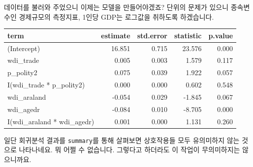 \documentclass[
]{book}
\newenvironment{Shaded}{\begin{snugshade}}{\end{snugshade}}
\newcommand{\DataTypeTok}[1]{\textcolor[rgb]{0.13,0.29,0.53}{#1}}
\newcommand{\DecValTok}[1]{\textcolor[rgb]{0.00,0.00,0.81}{#1}}
\newcommand{\KeywordTok}[1]{\textcolor[rgb]{0.13,0.29,0.53}{\textbf{#1}}}
\newcommand{\NormalTok}[1]{#1}
\newcommand{\OperatorTok}[1]{\textcolor[rgb]{0.81,0.36,0.00}{\textbf{#1}}}
\newcommand{\StringTok}[1]{\textcolor[rgb]{0.31,0.60,0.02}{#1}}
\begin{document}
데이터를 불러와 주었으니 이제는 모델을 만들어야겠죠? 단위의 문제가 있으니 종속변수인 경제규모의 측정지표, 1인당 GDP는 로그값을 취하도록 하겠습니다.

\begin{Shaded}
\end{Shaded}

\begin{tabular}{l|r|r|r|r}
\hline
term & estimate & std.error & statistic & p.value\\
\hline
(Intercept) & 16.851 & 0.715 & 23.576 & 0.000\\
\hline
wdi\_trade & 0.005 & 0.003 & 1.579 & 0.117\\
\hline
p\_polity2 & 0.075 & 0.039 & 1.922 & 0.057\\
\hline
I(wdi\_trade * p\_polity2) & 0.000 & 0.000 & 0.602 & 0.548\\
\hline
wdi\_araland & -0.054 & 0.029 & -1.845 & 0.067\\
\hline
wdi\_agedr & -0.084 & 0.010 & -8.705 & 0.000\\
\hline
I(wdi\_araland * wdi\_agedr) & 0.001 & 0.000 & 1.131 & 0.260\\
\hline
\end{tabular}

일단 회귀분석 결과를 \texttt{summary}를 통해 살펴보면 상호작용들 모두 유의미하지 않는 것으로 나타나네요. 뭐 어쩔 수 없습니다. 그렇다고 하더라도 이 작업이 무의미하지는 않으니까요.
\end{document}
